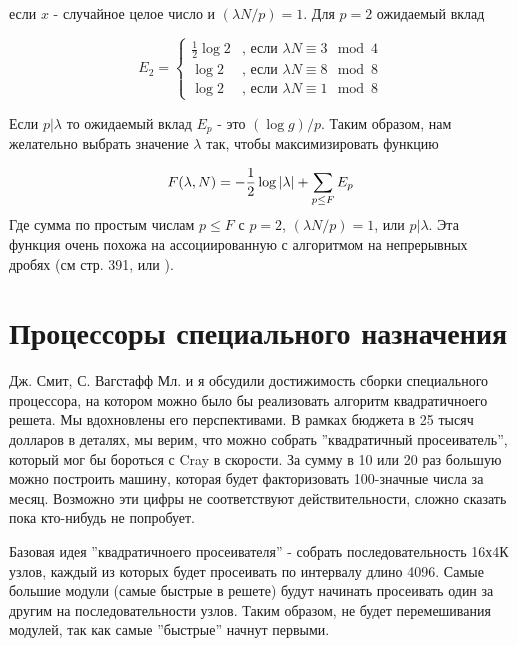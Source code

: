 \documentclass[a4paper,12pt]{report}
\DeclarePairedDelimiter\abs{\lvert}{\rvert}%
\begin{document}
если $x$ - случайное целое число и $(\lambda N/p) = 1$. Для $p = 2$ ожидаемый вклад 

\begin{equation*}
E_2 = \begin{cases}
\frac{1}{2}\log{2} &\text{, если $\lambda N \equiv 3 \mod 4$}\\
\log{2}            &\text{, если $\lambda N \equiv 8 \mod 8$}\\
\log{2}          &\text{, если $\lambda N \equiv 1 \mod 8$}
\end{cases}
\end{equation*} 

Если $p|\lambda$ то ожидаемый вклад $E_p$ - это $(\log{g})/p$. Таким образом, нам желательно выбрать значение $\lambda$ так, чтобы максимизировать функцию

\begin{equation*}
F(\lambda, N) = -\frac{1}{2} \log{\abs{\lambda}} + \sum_{p \leq F} E_p
\end{equation*}
Где  сумма по простым числам $p \leq F$ с $p = 2$, $(\lambda N /p) = 1$, или $p|\lambda$. Эта функция очень похожа на ассоциированную с алгоритмом на непрерывных дробях (см \cite{knuth} стр. 391, или \cite{wags}).

\section{Процессоры специального назначения}
Дж. Смит, С. Вагстафф Мл. и я обсудили достижимость сборки специального процессора, на котором можно было бы реализовать алгоритм квадратичноего решета. Мы вдохновлены его перспективами. В рамках бюджета в 25 тысяч долларов в деталях, мы верим, что можно собрать ''квадратичный просеиватель'', который мог бы бороться с Cray в скорости. За сумму в 10 или 20 раз большую можно построить машину, которая будет факторизовать 100-значные числа за месяц. Возможно эти цифры не соответствуют действительности, сложно сказать пока кто-нибудь не попробует.

Базовая идея ''квадратичноего просеивателя'' - собрать последовательность 16х4К узлов, каждый из которых будет просеивать по интервалу длино 4096. Самые большие модули (самые быстрые в решете) будут начинать просеивать один за другим на последовательности узлов. Таким образом, не будет перемешивания модулей, так как самые ''быстрые'' начнут первыми.

\nocite{*}





 
\end{document}
